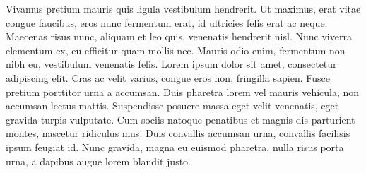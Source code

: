 Vivamus pretium mauris quis ligula vestibulum hendrerit. Ut maximus, erat vitae congue faucibus, eros nunc fermentum erat, id ultricies felis erat ac neque. Maecenas risus nunc, aliquam et leo quis, venenatis hendrerit nisl. Nunc viverra elementum ex, eu efficitur quam mollis nec. Mauris odio enim, fermentum non nibh eu, vestibulum venenatis felis. Lorem ipsum dolor sit amet, consectetur adipiscing elit. Cras ac velit varius, congue eros non, fringilla sapien. Fusce pretium porttitor urna a accumsan. Duis pharetra lorem vel mauris vehicula, non accumsan lectus mattis. Suspendisse posuere massa eget velit venenatis, eget gravida turpis vulputate. Cum sociis natoque penatibus et magnis dis parturient montes, nascetur ridiculus mus. Duis convallis accumsan urna, convallis facilisis ipsum feugiat id. Nunc gravida, magna eu euismod pharetra, nulla risus porta urna, a dapibus augue lorem blandit justo.

